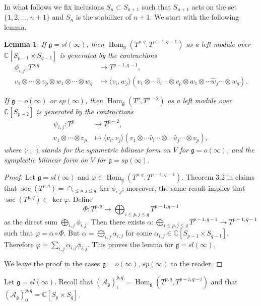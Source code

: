 \documentclass{amsart}
\renewcommand{\sl}{sl}
\newcommand{\so}{o}
\renewcommand{\sp}{sp}
\renewcommand{\gg}{\mathfrak{g}}
\newcommand{\soc}{\operatorname{soc}}
\newtheorem{lemma}[thm]{Lemma}
\theoremstyle{definition}
\numberwithin{equation}{section}
\begin{document}
In what follows we fix inclusions $S_n \subset S_{n+1}$ such that $S_{n+1}$ acts on the set $\{1,2, \ldots, n+1 \}$ and $S_n$ is the stabilizer of $n+1$. We start with the following lemma.
\begin{lemma} \label{contractions} If $\gg=\sl(\infty)$, then
$\operatorname{Hom}_\gg(T^{p,q}, T^{p-1,q-1})$ as a
left module over $\mathbb C[S_{p-1}\times S_{q-1}]$ is generated by the contractions
\begin{align*} \phi_{i,j} : T^{p,q} & \rightarrow T^{p-1,q-1}, \\
v_1\otimes\cdots\otimes v_p\otimes w_1\otimes\cdots\otimes w_q & \mapsto
\langle v_i,w_j\rangle (v_1\otimes\cdots\hat v_i\cdots\otimes
  v_p\otimes w_1\otimes\cdots\hat w_j\cdots\otimes w_q).
\end{align*}

If $\gg=\so(\infty)$ or $\sp(\infty)$, then
$\operatorname{Hom}_\gg(T^{p},T^{p-2})$ as a
left module over $\mathbb C[S_{p-2}]$ is generated by the
contractions  
\begin{align*} \psi_{i,j} : T^p & \rightarrow T^{p-2},\\
v_1\otimes\cdots\otimes v_p & \mapsto
\langle v_i,v_j\rangle (v_1\otimes\cdots\hat v_i\cdots\otimes\cdots\hat v_j\cdots\otimes v_p),
\end{align*}
where 
$\langle\cdot \, , \, \cdot\rangle $ stands for the symmetric bilinear form on $V$ for  $\gg=\so(\infty)$, and the symplectic bilinear form on $V$ for  $\gg=\sp(\infty)$.
\end{lemma}
\begin{proof} Let  $\gg=\sl(\infty)$ and $\varphi\in \operatorname{Hom}_\gg(T^{p,q}, T^{p-1,q-1})$.  
Theorem 3.2  in \cite{PStyr} claims that  $\soc(T^{p,q})=\cap_{i\leq p,j\leq q}\operatorname{ker}\phi_{i,j}$; moreover, the same result implies that $\soc(T^{p,q})\subset\operatorname{ker}\varphi$. 
Define $$\Phi:T^{p,q}\to \bigoplus_{i\leq p,j\leq q} T^{p-1,q-1}$$ as the
direct sum $\bigoplus_{i,j} \phi_{i,j}$. Then there exists $\alpha:\bigoplus_{i\leq  p,j\leq q} T^{p-1,q-1}\to  T^{p-1,q-1}$ 
such that $\varphi=\alpha\circ\Phi$. But $\alpha=\bigoplus_{i,j} \alpha_{i,j}$
for some $\alpha_{i,j}\in \mathbb C[S_{p-1}\times S_{q-1}]$. Therefore
$\varphi=\sum_{i,j} \alpha_{i,j}\phi_{i,j}$.  This proves the lemma for $\gg = \sl(\infty)$.

We leave the proof in the cases  $\gg=\so(\infty)$, $\sp(\infty)$  to the reader.
\end{proof}


Let $\gg=\sl(\infty)$. Recall that $(\mathcal A_\gg)^{p,q}_i=\operatorname{Hom}_\gg(T^{p,q}, T^{p-i,q-i})$ and that $(\mathcal A_\gg)^{p,q}_0=\mathbb C[S_p\times S_q]$.
\end{document}
